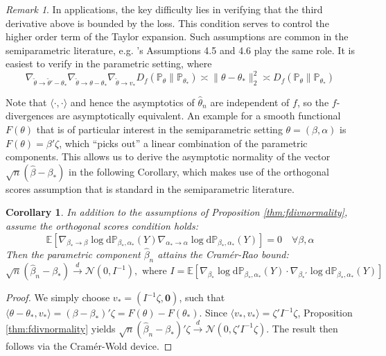 \documentclass[12pt]{article}
\def\D{\mathrm{d}}
\theoremstyle{myplain}
\newtheorem{propcorollary}{Corollary}[proposition]
\theoremstyle{definition}
\theoremstyle{definition}
\theoremstyle{remark}
\newtheorem{remark}{Remark}[section]
\numberwithin{equation}{section}
\begin{document}
\begin{remark}\label{rem:parametrictaylor}
In applications, the key difficulty lies in verifying that the third derivative above is bounded by the loss. This condition serves to control the higher order term of the Taylor expansion. Such assumptions are common in the semiparametric literature, e.g. \cite{aichen2003}'s Assumptions 4.5 and 4.6 play the same role. It is easiest to verify in the parametric setting, where 
$$\nabla_{\widetilde\theta \to \widetilde\theta'-\theta_*}\nabla_{\widetilde\theta \to \theta-\theta_*}\nabla_{\widetilde\theta \to v_*} D_f(\mathbb{P}_\theta\|\mathbb{P}_{\theta_*})\asymp \|\theta-\theta_*\|^2_2 \asymp D_f(\mathbb{P}_\theta\|\mathbb{P}_{\theta_*})$$
\end{remark}
Note that $\langle\cdot,\cdot\rangle$ and hence the asymptotics of $\widehat\theta_n$ are independent of $f$, so the $f$-divergences are asymptotically equivalent. An example for a smooth functional $F(\theta)$ that is of particular interest in the semiparametric setting $\theta=(\beta, \alpha)$ is $F(\theta)=\beta'\zeta$, which ``picks out'' a linear combination of the parametric components. This allows us to derive the asymptotic normality of the vector $\sqrt{n}(\widehat\beta-\beta_*)$ in the following Corollary, which makes use of the orthogonal scores assumption that is standard in the semiparametric literature.

\begin{propcorollary}
In addition to the assumptions of Proposition \ref{thm:fdivnormality}, assume the orthogonal scores condition holds: 
$$\mathbb{E} \left[\nabla_{\beta_*\to\beta} \log \D\mathbb{P}_{\beta_*, \alpha_*}(Y)\nabla_{\alpha_*\to\alpha} \log \D\mathbb{P}_{\beta_*, \alpha_*}(Y)\right]=0 \quad \forall \beta,\alpha$$
Then the parametric component $\widehat{\beta}_n$ attains the Cramér-Rao bound:
$$ \sqrt{n}(\widehat\beta_n-\beta_*) \overset{d}{\rightarrow} \mathcal{N}\left(0, I^{-1}\right), \text{ where } I=\mathbb{E}\left[\nabla_{\beta_*}\log \D\mathbb{P}_{\beta_*,\alpha_*}(Y)\cdot\nabla_{\beta_*'}\log \D\mathbb{P}_{\beta_*,\alpha_*}(Y)\right]$$
\end{propcorollary}

\begin{proof}
We simply choose $v_*=(I^{-1}\zeta, \mathbf{0})$, such that $\langle\theta-\theta_*, v_*\rangle=(\beta-\beta_*)'\zeta=F(\theta)-F(\theta_*)$. Since $\langle v_*, v_*\rangle=\zeta' I^{-1}\zeta$, Proposition \ref{thm:fdivnormality} yields $\sqrt{n}(\widehat\beta_n-\beta_*)'\zeta\overset{d}{\to}\mathcal{N}(0,\zeta' I^{-1}\zeta)$. The result then follows via the Cramér-Wold device.
\end{proof}
\end{document}
